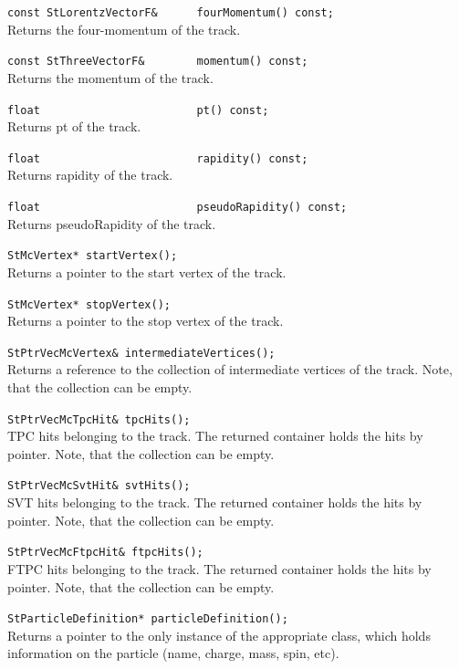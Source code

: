 \begin{Entry}
    \verb+const StLorentzVectorF&      fourMomentum() const;+\\
    Returns the four-momentum of the track.

    \verb+const StThreeVectorF&        momentum() const;+\\
    Returns the momentum of the track.

    \verb+float                        pt() const;+\\
    Returns pt of the track.

    \verb+float                        rapidity() const;+\\
    Returns rapidity of the track.

    \verb+float                        pseudoRapidity() const;+\\
    Returns pseudoRapidity of the track.

    \verb+StMcVertex* startVertex();+\\
    Returns a pointer to the start vertex of the track.

    \verb+StMcVertex* stopVertex();+\\
    Returns a pointer to the stop vertex of the track.

    \verb+StPtrVecMcVertex& intermediateVertices();+\\
    Returns a reference to the collection of intermediate vertices of the track.
    Note, that the collection can be empty.

    \verb+StPtrVecMcTpcHit& tpcHits();+\\
    TPC hits belonging to the track.
    The returned container holds the
    hits by pointer. Note, that the collection can be empty.

    \verb+StPtrVecMcSvtHit& svtHits();+\\
    SVT hits belonging to the track.
    The returned container holds the
    hits by pointer. Note, that the collection can be empty.

    \verb+StPtrVecMcFtpcHit& ftpcHits();+\\
    FTPC hits belonging to the track.
    The returned container holds the
    hits by pointer. Note, that the collection can be empty.

    \verb+StParticleDefinition* particleDefinition();+\\
    Returns a pointer to the only instance of the appropriate
     class, which holds
    information on the particle (name, charge, mass, spin, etc).


\end{Entry}
